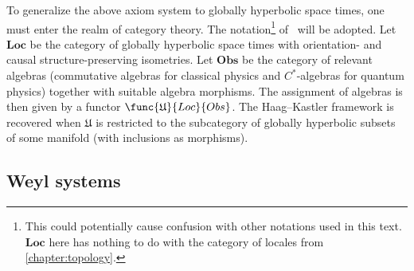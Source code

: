     To generalize the above axiom system to globally hyperbolic space times, one must enter the realm of category theory. The notation\footnote{This could potentially cause confusion with other notations used in this text. $\mathbf{Loc}$ here has nothing to do with the category of locales from \cref{chapter:topology}.} of~\citet{calaque_mathematical_2015} will be adopted. Let $\mathbf{Loc}$ be the category of globally hyperbolic space times with orientation- and causal structure-preserving isometries. Let $\mathbf{Obs}$ be the category of relevant algebras (commutative algebras for classical physics and $C^*$-algebras for quantum physics) together with suitable algebra morphisms. The assignment of algebras is then given by a functor $\func{\mathfrak{U}}{Loc}{Obs}$. The Haag--Kastler framework is recovered when $\mathfrak{U}$ is restricted to the subcategory of globally hyperbolic subsets of some manifold (with inclusions as morphisms).

\subsection{Weyl systems}



